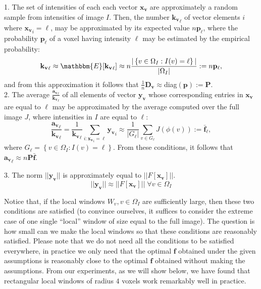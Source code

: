 1. The set of intensities of each each vector $\mathbf{x_{v}}$ are approximately a random sample from intensities of image $I$. Then, the number $\mathbf{k_{v}}_{\ell}$ of vector elements $i$ where $\mathbf{x_{v}}_{i} = \ell$, may be approximated by its expected value $n\mathbf{p}_{\ell}$, where the probability $\mathbf{p}_{\ell}$ of a voxel having intensity $\ell$ may be estimated by the empirical probability:
\begin{equation}
    \mathbf{k_{v}}_{\ell} \approx \mathbbm{E}[\mathbf{k_{v}}_{\ell}] \approx n\frac{|\left\lbrace v\in\Omega_{I} : I(v) = \ell\right\rbrace|}{|\Omega_{I}|} := n\mathbf{p}_{\ell},
\end{equation}
and from this approximation it follows that $\frac{1}{n}\mathbf{D_{v}} \approx $diag$(\mathbf{p}) := \mathbf{P}$.\\

2. The average $\frac{\mathbf{a_{v}}_{\ell}}{\mathbf{k_{v}}_{\ell}}$ of all elements of vector $\mathbf{y_{v}}$ whose corresponding entries in $\mathbf{x_{v}}$ are equal to $\ell$ may be approximated by the average computed over the full image $J$, where intensities in $I$ are equal to $\ell$:
\begin{equation}
    \frac{\mathbf{a_{v}}_{\ell}}{\mathbf{k_{v}}_{\ell}} =  \frac{1}{\mathbf{k_{v}}_{\ell}}\sum_{i:\mathbf{x_{v}}_{i}=\ell} \mathbf{y_{v}}_{i} \approx \frac{1}{|G_{\ell}|}\sum_{v\in G_{\ell}} J(\phi(v))
    :=\bar{\mathbf{f}}_{\ell},
\end{equation}
where $G_{\ell} = \left\lbrace v\in \Omega_{I}: I(v) = \ell\right\rbrace$. From these conditions, it follows that $\mathbf{a_{v}}_{\ell} \approx n \mathbf{P} \mathbf{\bar{f}}$.

3. The norm $||\mathbf{y_{v}}||$ is approximately equal to $||F[\mathbf{x_{v}}]||$.
\begin{equation}
    ||\mathbf{y_{v}}|| \approx ||F[\mathbf{x_{v}}]|| \; \forall v\in\Omega_{I}
\end{equation}

Notice that, if the local windows $W_{v}, v\in\Omega_{I}$ are sufficiently large, then these two conditions are satisfied (to convince ourselves, it suffices to consider the extreme case of one single ``local'' window of size equal to the full image). The question is how small can we make the local windows so that these conditions are reasonably satisfied. Please note that we do not need all the conditions to be satisfied everywhere, in practice we only need that the optimal $\mathbf{f}$ obtained under the given assumptions is reasonably close to the optimal $\mathbf{f}$ obtained without making the assumptions. From our experiments, as we will show below, we have found that rectangular local windows of radius $4$ voxels work remarkably well in practice.\\

